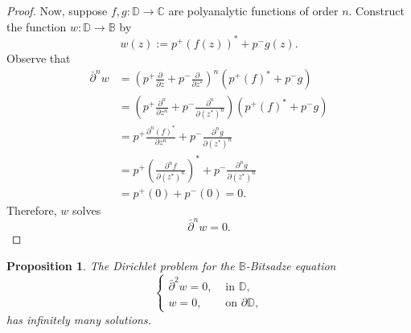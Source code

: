\documentclass[12pt,reqno]{amsart}
\newtheorem{prop}[theorem]{Proposition}
\theoremstyle{definition}
\theoremstyle{remark}
\newcommand{\p}{\partial}
\newcommand{\dbar}{\bar\partial}
\newcommand{\bc}{\mathbb{B}}
\newcommand{\disk}{\mathbb{D}}
\begin{document}
\begin{proof}
                Now, suppose $f, g : \disk \to \mathbb{C}$ are polyanalytic functions of order $n$. Construct the function $w: \disk \to \bc$ by 
                \[
                    w(z) := p^+ (f(z))^* + p^- g(z).
                \]
                Observe that 
                \begin{align*}
                    \dbar^n w &= \left( p^+ \frac{\p}{\p z} + p^- \frac{\p}{\p z^*}\right)^n (p^+ (f)^* + p^- g)\\
                    &= \left( p^+ \frac{\p^n}{\p z^n} + p^- \frac{\p^n}{\p (z^*)^n}\right) (p^+ (f)^* + p^- g)\\
                    &= p^+ \frac{\p^n (f)^*}{\p z^n} + p^- \frac{\p^n g }{\p (z^*)^n} \\
                    &= p^+ \left(\frac{\p^n f}{\p (z^*)^n}\right)^* + p^- \frac{\p^n g }{\p (z^*)^n} \\
                    &= p^+ (0) + p^- ( 0) = 0. 
                \end{align*}
                Therefore, $w$ solves 
                \[
                    \dbar^n w = 0.
                \]
            \end{proof}

            \begin{prop}\label{prop: bicomplexbitsadzedirichlet}
                The Dirichlet problem for the $\bc$-Bitsadze equation
                \begin{equation}\label{eq: bicomplexdirichleteuation}
                    \begin{cases}
                    \dbar^2 w = 0, & \text{ in } \disk,\\
                    w = 0, & \text{ on } \p\disk,
                    \end{cases}
                \end{equation}
                has infinitely many solutions. 
            \end{prop}
\end{document}
